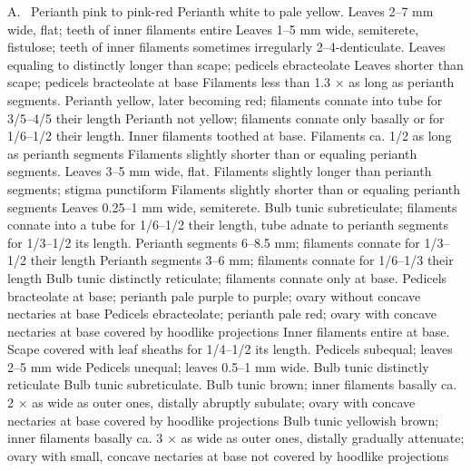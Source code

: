 \documentclass{ctexart}
\begin{document}
\begin{Key*}{A.~}
\alter Perianth pink to pink-red
\alter Perianth white to pale yellow.
\alter Leaves 2--7 mm wide, flat; teeth of inner filaments entire
\alter Leaves 1--5 mm wide, semiterete, fistulose; teeth of inner filaments sometimes irregularly 2--4-denticulate.
\alter Leaves equaling to distinctly longer than scape; pedicels ebracteolate
\alter Leaves shorter than scape; pedicels bracteolate at base
\alter Filaments less than 1.3 × as long as perianth segments.
\alter Perianth yellow, later becoming red; filaments connate into tube for 3/5--4/5 their length
\alter Perianth not yellow; filaments connate only basally or for 1/6--1/2 their length.
\alter Inner filaments toothed at base.
\alter Filaments ca. 1/2 as long as perianth segments
\alter Filaments slightly shorter than or equaling perianth segments.
\alter Leaves 3--5 mm wide, flat.
\alter Filaments slightly longer than perianth segments; stigma punctiform
\alter Filaments slightly shorter than or equaling perianth segments
\alter Leaves 0.25--1 mm wide, semiterete.
\alter Bulb tunic subreticulate; filaments connate into a tube for 1/6--1/2 their length, tube adnate to perianth segments for 1/3--1/2 its length.
\alter Perianth segments 6--8.5 mm; filaments connate for 1/3--1/2 their length
\alter Perianth segments 3--6 mm; filaments connate for 1/6--1/3 their length
\alter Bulb tunic distinctly reticulate; filaments connate only at base.
\alter Pedicels bracteolate at base; perianth pale purple to purple; ovary without concave nectaries at base
\alter Pedicels ebracteolate; perianth pale red; ovary with concave nectaries at base covered by hoodlike projections
\alter Inner filaments entire at base.
\alter Scape covered with leaf sheaths for 1/4--1/2 its length.
\alter Pedicels subequal; leaves 2--5 mm wide
\alter Pedicels unequal; leaves 0.5--1 mm wide.
\alter Bulb tunic distinctly reticulate
\alter Bulb tunic subreticulate.
\alter Bulb tunic brown; inner filaments basally ca. 2 × as wide as outer ones, distally abruptly subulate; ovary with concave nectaries at base covered by hoodlike projections
\alter Bulb tunic yellowish brown; inner filaments basally ca. 3 × as wide as outer ones, distally gradually attenuate; ovary with small, concave nectaries at base not covered by hoodlike projections

\end{Key*}
\end{document}
